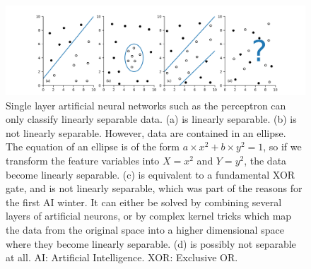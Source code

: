 \begin{figure}[hbtp]
	\centering
	\def\svgwidth{1\columnwidth}
	\fontsize{10pt}{10pt}\selectfont
	\includegraphics[width=1\linewidth]{"../Chap2/Figures/Fig_linearly_sep.png"}
	\caption{Single layer artificial neural networks such as the perceptron can only classify linearly separable data. (a) is linearly separable. (b) is not linearly separable. However, data are contained in an ellipse. The equation of an ellipse is of the form \(a \times x^2+b\times y^2=1\), so if we transform the feature variables into \(X=x^2\) and \(Y=y^2\), the data become linearly separable. (c) is equivalent to a fundamental XOR gate, and is not linearly separable, which was part of the reasons for the first AI winter. It can either be solved by combining several layers of artificial neurons, or by complex kernel tricks which map the data from the original space into a higher dimensional space where they become linearly separable. (d) is possibly not separable at all. AI: Artificial Intelligence. XOR: Exclusive OR.} 
	\label{fig_linearly_sep}
\end{figure}


